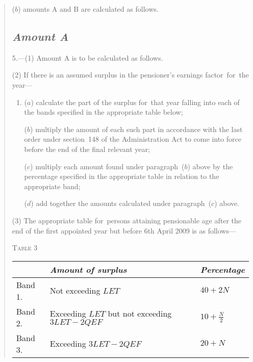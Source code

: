 \documentclass[12pt,a4paper]{article}
\begin{document}
\begin{quotation}
\begin{enumerate}
($b$) amounts A and B are calculated as follows.
\end{enumerate}

\subsection*{\itshape Amount A}

5.---(1) Amount A is to be calculated as follows.

(2) If there is an assumed surplus in the pensioner’s earnings factor~for~the year—
\begin{enumerate}\item[]
($a$) calculate the part of the surplus for~that year falling into each of the bands specified in the appropriate table below;

($b$) multiply the amount of each such part in accordance with the last order under section~148 of the Administration Act to come into force before the end of the final relevant year;

($c$) multiply each amount found under paragraph~($b$)  above by the percentage specified in the appropriate table in relation to the appropriate band;

\begin{sloppypar}
($d$) add together the amounts calculated under paragraph~($c$)  above.
\end{sloppypar}
\end{enumerate}

(3) The appropriate table for~persons attaining pensionable age after the end of the first appointed year but before 6th April 2009 is as follows—

\medskip

\noindent\textsc{Table 3}

{\noindent\footnotesize
\begin{longtable}{lll}
\hline
&\itshape Amount of surplus	&\itshape Percentage\\
\hline
\endhead
\hline
\endlastfoot
Band 1. 	&Not exceeding $LET$	&$40 + 2N$\\
Band 2. 	&Exceeding $LET$ but not exceeding $3LET - 2QEF$	&$10 + \frac{N}{2}$\\
Band 3. 	&Exceeding $3LET - 2QEF$	&$20 + N$\\
\end{longtable}

}


\end{quotation}
\end{document}
